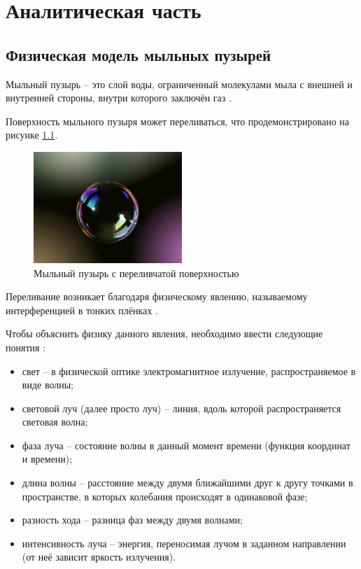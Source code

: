 \chapter{Аналитическая часть}

\section{Физическая модель мыльных пузырей}

Мыльный пузырь -- это слой воды, ограниченный молекулами мыла с внешней и внутренней стороны, внутри которого заключён газ \cite{interference}.

Поверхность мыльного пузыря может переливаться, что продемонстрировано на рисунке \ref{fig:soap_bubble}.

\begin{figure}[h]
	\centering
	\includegraphics[width=0.5\textwidth]{img/soap_bubble.png}
	\caption{Мыльный пузырь с переливчатой поверхностью \cite{bubble_photo}}
	\label{fig:soap_bubble}
\end{figure}

Переливание возникает благодаря физическому явлению, называемому интерференцией в тонких плёнках \cite{interference}. 

Чтобы объяснить физику данного явления, необходимо ввести следующие понятия \cite{berne2000dynamic}:

\begin{itemize}[label=---]
    \item свет -- в физической оптике электромагнитное излучение, распространяемое в виде волны;
    \item световой луч (далее просто луч) -- линия, вдоль которой распространяется световая волна;
    \item фаза луча -- состояние волны в данный момент времени (функция координат и времени);
    \item длина волны -- расстояние между двумя ближайшими друг к другу точками в пространстве, в которых колебания происходят в одинаковой фазе;
    \item разность хода -- разница фаз между двумя волнами;
    \item интенсивность луча -- энергия, переносимая лучом в заданном направлении (от неё зависит яркость излучения).
\end{itemize}

